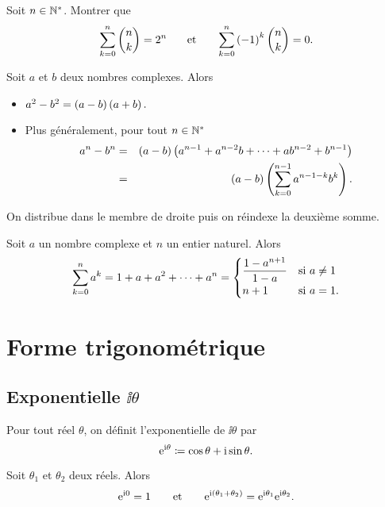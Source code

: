 \documentclass{magnoliaold}
\begin{document}
\begin{exoUnique}
\exo Soit $n\in{\mathbb{N}^*}$. Montrer que
  \[\sum_{k=0}^n  \binom{n}{k}=2^n \quad\quad\!\text{et}\quad\!\quad  \sum_{k=0}^n  \left(-1\right)^k\binom{n}{k}=0.\]
\end{exoUnique}


\begin{proposition}[utile=-3]
  Soit $a$ et $b$ deux nombres complexes. Alors
  \begin{itemize}
  \item $a^2-b^2=\left(a-b\right)\left(a+b\right).$
  \item Plus généralement, pour tout $n\in{\mathbb{N}^*}$
    \begin{eqnarray*}
  a^n-b^n
  &=& \left(a-b\right)\left(a^{n-1}+a^{n-2}b+\dots+
      ab^{n-2}+b^{n-1}\right)\\
  &=& \left(a-b\right)\left(\sum_{k=0}^{n-1} a^{n-1-k}b^k\right).
  \end{eqnarray*}
  \end{itemize}
\end{proposition}

\begin{preuve}
On distribue dans le membre de droite puis on réindexe la deuxième somme.
\end{preuve}

\begin{proposition}[utile=-3]
Soit $a$ un nombre complexe et $n$ un entier naturel. Alors
\[\sum_{k=0}^n a^k=1+a+a^2+\cdots+a^n=
  \begin{cases}
  \displaystyle\frac{1-a^{n+1}}{1-a} & \text{si $a\neq 1$}\\
  n+1                  & \text{si $a=1$.}
  \end{cases}\]
\end{proposition}

\section{Forme trigonométrique}

\subsection{Exponentielle $\ii\theta$}

\begin{definition}[utile=-3]
Pour tout réel $\theta$, on définit l'exponentielle de $\ii\theta$ par
\[{\rm e}^{{\rm i}\theta}\coloneqq\cos\theta+{\rm i}\sin\theta.\]
\end{definition}

\begin{proposition}[utile=-3]
Soit $\theta_1$ et $\theta_2$ deux réels. Alors
\[{\rm e}^{{\rm i} 0}=1 \qquad\text{et}\qquad {\rm e}^{{\rm i}\left(\theta_1+\theta_2\right)}={\rm e}^{{\rm i}\theta_1}{\rm e}^{{\rm i}\theta_2}.\]
\end{proposition}
\end{document}
